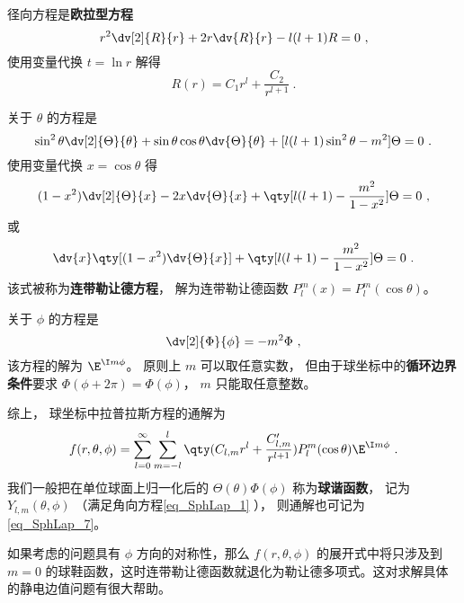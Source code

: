 径向方程是\textbf{欧拉型方程}
\begin{equation}
r^2\dv[2]{R}{r} + 2r\dv{R}{r} - l(l+1)R = 0~,
\end{equation}
使用变量代换 $t = \ln r$ 解得
\begin{equation}
R(r) = C_1 r^l + \frac{C_2}{r^{l+1}}~.
\end{equation}

关于 $\theta$ 的方程是
\begin{equation}
\sin^2\theta \dv[2]{\Theta}{\theta} + \sin\theta\cos\theta\dv{\Theta}{\theta} + [l(l+1)\sin^2\theta - m^2] \Theta = 0~.
\end{equation}
使用变量代换 $x = \cos\theta$ 得
\begin{equation}
(1-x^2)\dv[2]{\Theta}{x} - 2x\dv{\Theta}{x} + \qty[l(l+1) - \frac{m^2}{1-x^2}]\Theta = 0~,
\end{equation}
或
\begin{equation}
\dv{x} \qty[(1-x^2)\dv{\Theta}{x}] + \qty[l(l+1) - \frac{m^2}{1-x^2}]\Theta = 0~.
\end{equation}
该式被称为\textbf{连带勒让德方程}， 解为连带勒让德函数 $P_l^m(x) = P_l^m(\cos\theta)$。

关于 $\phi$ 的方程是
\begin{equation}
\dv[2]{\Phi}{\phi} = -m^2 \Phi~,
\end{equation}
该方程的解为 $\E^{\I m\phi}$。 原则上 $m$ 可以取任意实数， 但由于球坐标中的\textbf{循环边界条件}要求 $\Phi(\phi + 2\pi) = \Phi(\phi)$， $m$ 只能取任意整数。

综上， 球坐标中拉普拉斯方程的通解为
\begin{equation}\label{eq_SphLap_6}
f(r, \theta, \phi) = \sum_{l = 0}^\infty \sum_{m = -l}^l \qty(C_{l,m} r^l + \frac{C'_{l,m}}{r^{l+1}})P_l^m(\cos\theta)\E^{\I m\phi}~.
\end{equation}
我们一般把在单位球面上归一化后的 $\Theta(\theta)\Phi(\phi)$ 称为\textbf{球谐函数}， 记为 $Y_{l,m}(\theta,\phi)$ （满足角向方程\autoref{eq_SphLap_1} ）， 则通解也可记为\autoref{eq_SphLap_7}。

如果考虑的问题具有 $\phi$ 方向的对称性，那么 $f(r,\theta,\phi)$ 的展开式中将只涉及到 $m=0$ 的球鞋函数，这时连带勒让德函数就退化为勒让德多项式。这对求解具体的静电边值问题有很大帮助。
